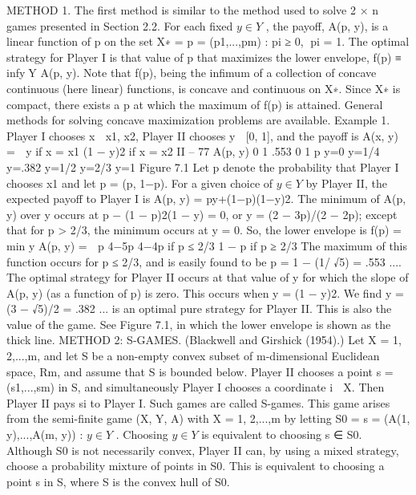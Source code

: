 \documentclass[]{report}
\begin{document}
METHOD 1. The first method is similar to the method used to solve 2 × n games
presented in Section 2.2. For each fixed $y \in Y$ , the payoff, A(p, y), is a linear function of p
on the set X∗ = {p = (p1,...,pm) : pi ≥ 0,
pi = 1}. The optimal strategy for Player I is
that value of p that maximizes the lower envelope, f(p) ≡ infy∈Y A(p, y). Note that f(p),
being the infimum of a collection of concave continuous (here linear) functions, is concave
and continuous on X∗. Since X∗ is compact, there exists a p at which the maximum of f(p)
is attained. General methods for solving concave maximization problems are available.
Example 1. Player I chooses x ∈ {x1, x2}, Player II chooses y ∈ [0, 1], and the payoff
is
A(x, y) =  y if x = x1
(1 − y)2 if x = x2
II – 77
A(p, y)
0 1 .553
0
1
p
y=0
y=1/4
y=.382
y=1/2
y=2/3
y=1
Figure 7.1
Let p denote the probability that Player I chooses x1 and let p = (p, 1−p). For a given
choice of $y \in Y$ by Player II, the expected payoff to Player I is A(p, y) = py+(1−p)(1−y)2.
The minimum of A(p, y) over y occurs at p − (1 − p)2(1 − y) = 0, or y = (2 − 3p)/(2 − 2p);
except that for p > 2/3, the minimum occurs at y = 0. So, the lower envelope is
f(p) = min
y
A(p, y) =  p 4−5p
4−4p
if p ≤ 2/3
1 − p if p ≥ 2/3
The maximum of this function occurs for p ≤ 2/3, and is easily found to be p = 1 −
(1/
√5) = .553 .... The optimal strategy for Player II occurs at that value of y for which
the slope of A(p, y) (as a function of p) is zero. This occurs when y = (1 − y)2. We find
y = (3 − √5)/2 = .382 ... is an optimal pure strategy for Player II. This is also the value
of the game. See Figure 7.1, in which the lower envelope is shown as the thick line.
METHOD 2: S-GAMES. (Blackwell and Girshick (1954).) Let X = {1, 2,...,m},
and let S be a non-empty convex subset of m-dimensional Euclidean space, Rm, and
assume that S is bounded below. Player II chooses a point s = (s1,...,sm) in S, and
simultaneously Player I chooses a coordinate i ∈ X. Then Player II pays si to Player I.
Such games are called S-games.
This game arises from the semi-finite game (X, Y, A) with X = {1, 2,...,m} by letting
S0 = {s = (A(1, y),...,A(m, y)) : $y \in Y$ }. Choosing $y \in Y$ is equivalent to choosing
s ∈ S0. Although S0 is not necessarily convex, Player II can, by using a mixed strategy,
choose a probability mixture of points in S0. This is equivalent to choosing a point s in
S, where S is the convex hull of S0.
\end{document}
